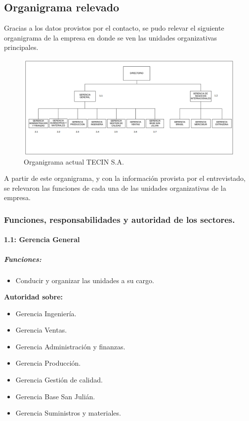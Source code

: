 \documentclass[a4paper,10pt]{article}
\begin{document}
	\subsection{Organigrama relevado}
	Gracias a los datos provistos por el contacto, se pudo relevar el siguiente organigrama de la empresa en donde se ven las unidades organizativas principales.
	\begin{figure}[H]
		\centering
		\includegraphics[width=15cm]{imagenes/actualOrganigrama.png}
		\caption{Organigrama actual TECIN S.A.}
	\end{figure}
	A partir de este organigrama, y con la información provista por el entrevistado, se relevaron las funciones de cada una de las unidades organizativas de la empresa.
	\subsubsection{Funciones, responsabilidades y autoridad de los sectores.}
		\paragraph{1.1: Gerencia General} 
		\subparagraph{Funciones:}

		\begin{itemize}
			\item Conducir y organizar las unidades a su cargo.
 		\end{itemize}
		
		\textbf{Autoridad sobre:}

		\begin{itemize}
			\item Gerencia Ingeniería.
			\item Gerencia Ventas.
			\item Gerencia Administración y finanzas.
			\item Gerencia Producción.
			\item Gerencia Gestión de calidad.
			\item Gerencia Base San Julián.
			\item Gerencia Suministros y materiales.
		\end{itemize}
\end{document}
